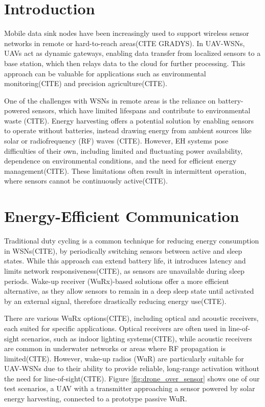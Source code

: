 \documentclass[conference]{IEEEtran}
\begin{document}
\section{Introduction}

Mobile data sink nodes have been increasingly used to support wireless sensor networks in remote or hard-to-reach areas(CITE GRADYS). In UAV-WSNs, UAVs act as dynamic gateways, enabling data transfer from localized sensors to a base station, which then relays data to the cloud for further processing. This approach can be valuable for applications such as environmental monitoring(CITE) and precision agriculture(CITE).

One of the challenges with WSNs in remote areas is the reliance on battery-powered sensors, which have limited lifespans and contribute to environmental waste (CITE). Energy harvesting offers a potential solution by enabling sensors to operate without batteries, instead drawing energy from ambient sources like solar or radiofrequency (RF) waves (CITE). However, EH systems pose difficulties of their own, including limited and fluctuating power availability, dependence on environmental conditions, and the need for efficient energy management(CITE). These limitations often result in intermittent operation, where sensors cannot be continuously active(CITE).

\section{Energy-Efficient Communication}

Traditional duty cycling is a common technique for reducing energy consumption in WSNs(CITE), by periodically switching sensors between active and sleep states. While this approach can extend battery life, it introduces latency and limits network responsiveness(CITE), as sensors are unavailable during sleep periods. Wake-up receiver (WuRx)-based solutions offer a more efficient alternative, as they allow sensors to remain in a deep sleep state until activated by an external signal, therefore drastically reducing energy use(CITE).

There are various WuRx options(CITE), including optical and acoustic receivers, each suited for specific applications. Optical receivers are often used in line-of-sight scenarios, such as indoor lighting systems(CITE), while acoustic receivers are common in underwater networks or areas where RF propagation is limited(CITE). However, wake-up radios (WuR) are particularly suitable for UAV-WSNs due to their ability to provide reliable, long-range activation without the need for line-of-sight(CITE). Figure \ref{fig:drone_over_sensor} shows one of our test scenarios, a UAV with a transmitter approaching a sensor powered by solar energy harvesting, connected to a prototype passive WuR.
\end{document}
